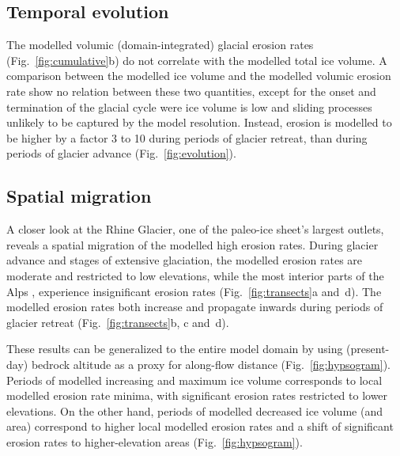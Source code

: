 \documentclass[utf8]{article}
\begin{document}
\subsection{Temporal evolution}

    The modelled volumic (domain-integrated) glacial erosion rates
    (Fig.~\ref{fig:cumulative}b) do not correlate with the modelled total ice
    volume. A comparison between the modelled ice volume and the modelled
    volumic erosion rate show no relation between these two quantities, except
    for the onset and termination of the glacial cycle were ice volume is low
    and sliding processes unlikely to be captured by the model resolution.
    Instead, erosion is modelled to be higher by a factor 3 to 10 during
    periods of glacier retreat, than during periods of glacier advance
    (Fig.~\ref{fig:evolution}).

\subsection{Spatial migration}

    A closer look at the Rhine Glacier, one of the paleo-ice sheet's largest
    outlets, reveals a spatial migration of the modelled high erosion rates.
    During glacier advance and stages of extensive glaciation, the modelled
    erosion rates are moderate and restricted to low elevations, while the
    most interior parts of the Alps \citep[modelled to be
    largely-cold-based][Fig.~6c]{Seguinot.etal.2018}, experience insignificant
    erosion rates (Fig.~\ref{fig:transects}a and~d). The modelled erosion
    rates both increase and propagate inwards during periods of glacier
    retreat (Fig.~\ref{fig:transects}b, c and~d).

    These results can be generalized to the entire model domain by using
    (present-day) bedrock altitude as a proxy for along-flow distance
    (Fig.~\ref{fig:hypsogram}). Periods of modelled increasing and maximum ice
    volume corresponds to local modelled erosion rate minima, with significant
    erosion rates restricted to lower elevations. On the other hand, periods of
    modelled decreased ice volume (and area) correspond to higher local
    modelled erosion rates and a shift of significant erosion rates to
    higher-elevation areas (Fig.~\ref{fig:hypsogram}).
\end{document}
